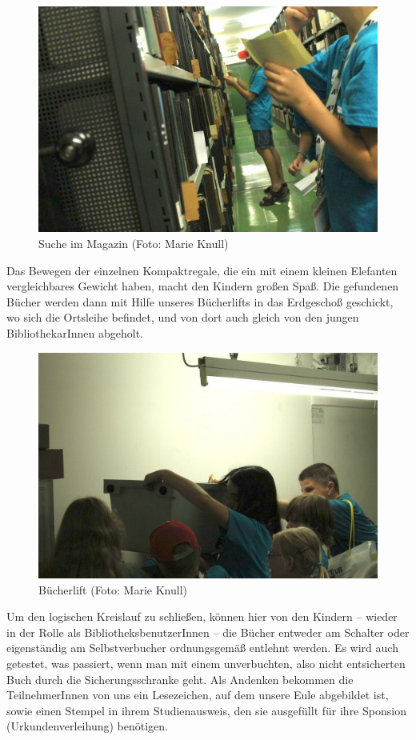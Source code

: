 \documentclass[a4paper,
fontsize=11pt,
oneside,
numbers=noperiodatend,
parskip=half-,
bibliography=totoc,
final
]{scrartcl}
\begin{document}
\begin{figure}
\centering
\includegraphics{img/image_4.jpg}
\caption{Suche im Magazin (Foto: Marie Knull)}
\end{figure}

Das Bewegen der einzelnen Kompaktregale, die ein mit einem kleinen
Elefanten vergleichbares Gewicht haben, macht den Kindern großen Spaß.
Die gefundenen Bücher werden dann mit Hilfe unseres Bücherlifts in das
Erdgeschoß geschickt, wo sich die Ortsleihe befindet, und von dort auch
gleich von den jungen BibliothekarInnen abgeholt.

\begin{figure}
\centering
\includegraphics{img/image_5.jpg}
\caption{Bücherlift (Foto: Marie Knull)}
\end{figure}

Um den logischen Kreislauf zu schließen, können hier von den Kindern --
wieder in der Rolle als BibliotheksbenutzerInnen -- die Bücher entweder
am Schalter oder eigenständig am Selbstverbucher ordnungsgemäß entlehnt
werden. Es wird auch getestet, was passiert, wenn man mit einem
unverbuchten, also nicht entsicherten Buch durch die Sicherungsschranke
geht. Als Andenken bekommen die TeilnehmerInnen von uns ein Lesezeichen,
auf dem unsere Eule abgebildet ist, sowie einen Stempel in ihrem
Studienausweis, den sie ausgefüllt für ihre Sponsion
(Urkundenverleihung) benötigen.
\end{document}

